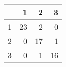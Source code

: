 \begin{tabular}{rrrr}
  \hline
 & 1 & 2 & 3 \\ 
  \hline
1 &  23 &   2 &   0 \\ 
  2 &   0 &  17 &   1 \\ 
  3 &   0 &   1 &  16 \\ 
   \hline
\end{tabular}
